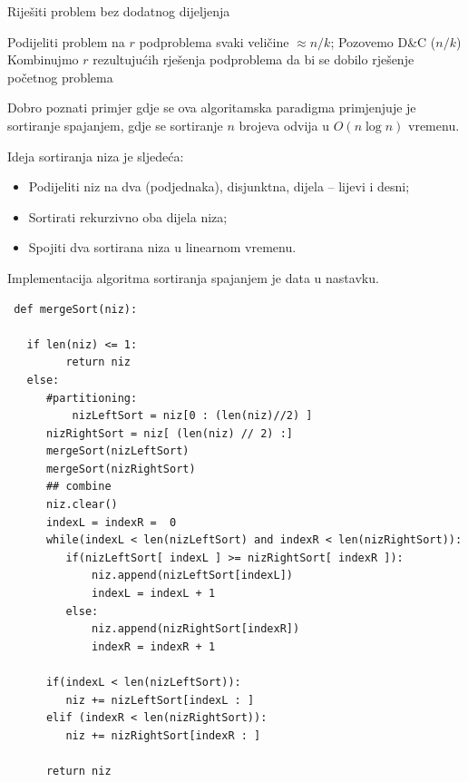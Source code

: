 \begin{algorithm}
	
\begin{algorithmic}[1]
 
  \State Riješiti problem bez dodatnog dijeljenja 
  \Else
 
   \State Podijeliti problem na $r$ podproblema svaki veličine $\approx n/k$;
        \State Pozovemo D\&C ($n/k$)
     \EndFor
   \State Kombinujmo $r$ rezultujućih rješenja podproblema da bi se dobilo rješenje početnog problema
\EndIf
\EndProcedure
\end{algorithmic}

\caption{Pseudokod algoritamske paradigme Podijeli-pa-zavladaj.}\label{alg:d-n-c}
\end{algorithm}
Dobro poznati primjer gdje se ova algoritamska paradigma primjenjuje je sortiranje spajanjem, gdje se sortiranje $n$ brojeva odvija u $O(n \log n)$ vremenu. 

Ideja sortiranja niza je sljedeća:
\begin{itemize}
	\item  Podijeliti niz na dva (podjednaka), disjunktna, dijela -- lijevi i desni;
    \item Sortirati rekurzivno oba dijela niza;
    \item Spojiti dva sortirana niza u linearnom vremenu.
\end{itemize}

Implementacija algoritma  sortiranja spajanjem  je data u nastavku.
\begin{verbatim}
 def mergeSort(niz):  

   if len(niz) <= 1:    
         return niz
   else:
      #partitioning:
          nizLeftSort = niz[0 : (len(niz)//2) ]
	  nizRightSort = niz[ (len(niz) // 2) :] 
	  mergeSort(nizLeftSort) 
	  mergeSort(nizRightSort)
	  ## combine
	  niz.clear()
	  indexL = indexR =  0
	  while(indexL < len(nizLeftSort) and indexR < len(nizRightSort)):
	 	 if(nizLeftSort[ indexL ] >= nizRightSort[ indexR ]):
	 		 niz.append(nizLeftSort[indexL])
	 		 indexL = indexL + 1
	 	 else:
	 		 niz.append(nizRightSort[indexR])
	 		 indexR = indexR + 1
	 
	  if(indexL < len(nizLeftSort)):
	 	 niz += nizLeftSort[indexL : ] 
	  elif (indexR < len(nizRightSort)):
	 	 niz += nizRightSort[indexR : ]
	 
	  return niz

\end{verbatim}

